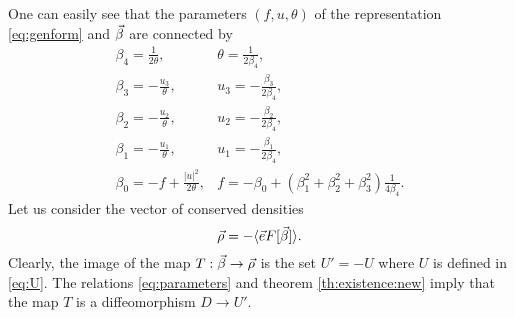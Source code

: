 One can easily see that the parameters $(f,u,\theta)$ of the representation \eqref{eq:genform} and ${\vec\beta}$ are connected by 
\begin{equation}\label{eq:parameters}
	\begin{array}{cc}
	\beta_4 = \frac{1}{2\theta},& \theta= \frac{1}{2\beta_4},\\
	\beta_3 = -\frac{u_3}{\theta},& u_3= -\frac{\beta_3}{2\beta_4},\\
	\beta_2 = -\frac{u_2}{\theta},& u_2= -\frac{\beta_2}{2\beta_4},\\
	\beta_1 = -\frac{u_1}{\theta},& u_1= -\frac{\beta_1}{2\beta_4},\\
	\beta_0 = -f+\frac{|u|^2}{2\theta},& f =-\beta_0 + (\beta_1^2+\beta_2^2+\beta_3^2) \frac{1}{4\beta_4}.
\end{array}
\end{equation}
Let us consider the vector of conserved  densities 
\begin{equation}\label{eq:compEulerRho}
  {\vec\rho} = -\langle \vec e F[{\vec\beta}]\rangle.
\end{equation} Clearly, the image of the map $T:{\vec\beta}\to{\vec\rho}$ is the set $U'=-U$ where $U$ is defined in \eqref{eq:U}. The relations \eqref{eq:parameters} and theorem \ref{th:existence:new} imply that the map $T$ is a diffeomorphism $D\to U'$.

